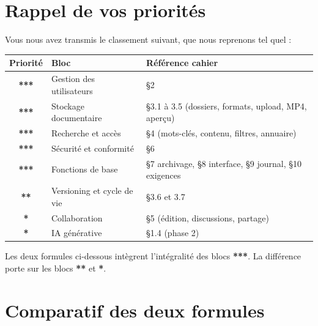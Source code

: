 \documentclass[a4paper,12pt,french]{article}
\begin{document}
\section{Rappel de vos priorités}

Vous nous avez transmis le classement suivant, que nous reprenons tel quel :

\vspace{0.5em}

\begin{tabularx}{\textwidth}{c l X}
\toprule
\textbf{Priorité} & \textbf{Bloc} & \textbf{Référence cahier} \\
\midrule
\rowcolor{lightgreen}
\textcolor{green3}{\textbf{***}} & Gestion des utilisateurs & §2 \\
\rowcolor{lightgreen}
\textcolor{green3}{\textbf{***}} & Stockage documentaire & §3.1 à 3.5 (dossiers, formats, upload, MP4, aperçu) \\
\rowcolor{lightgreen}
\textcolor{green3}{\textbf{***}} & Recherche et accès & §4 (mots-clés, contenu, filtres, annuaire) \\
\rowcolor{lightgreen}
\textcolor{green3}{\textbf{***}} & Sécurité et conformité & §6 \\
\rowcolor{lightgreen}
\textcolor{green3}{\textbf{***}} & Fonctions de base & §7 archivage, §8 interface, §9 journal, §10 exigences \\
\addlinespace
\rowcolor{lightblue}
\textcolor{blue2}{\textbf{**}} & Versioning et cycle de vie & §3.6 et 3.7 \\
\addlinespace
\rowcolor{lightorange}
\textcolor{orange1}{\textbf{*}} & Collaboration & §5 (édition, discussions, partage) \\
\rowcolor{lightorange}
\textcolor{orange1}{\textbf{*}} & IA générative & §1.4 (phase 2) \\
\bottomrule
\end{tabularx}

\vspace{0.8em}

Les deux formules ci-dessous intègrent l'intégralité des blocs \textcolor{green3}{\textbf{***}}. La différence porte sur les blocs \textcolor{blue2}{\textbf{**}} et \textcolor{orange1}{\textbf{*}}.

\section{Comparatif des deux formules}
\end{document}
